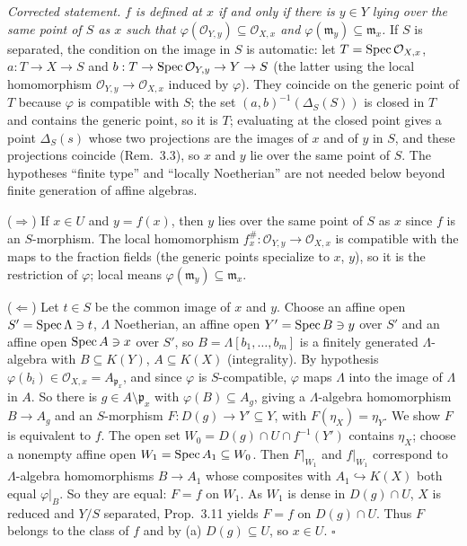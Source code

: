 \documentclass[11pt]{article}
\begin{document}
\emph{Corrected statement.} \emph{$f$ is defined at $x$ if and only if there is $y\in Y$ lying over the same point of $S$ as $x$ such that $\varphi(\mathcal O_{Y,y})\subseteq\mathcal O_{X,x}$ and $\varphi(\mathfrak m_y)\subseteq\mathfrak m_x$.} If $S$ is separated, the condition on the image in $S$ is automatic: let $T=\operatorname{Spec}\mathcal O_{X,x}$, $a:T\to X\to S$ and $b:T\to\operatorname{Spec}\mathcal O_{Y,y}\to Y\to S$ (the latter using the local homomorphism $\mathcal O_{Y,y}\to\mathcal O_{X,x}$ induced by $\varphi$). They coincide on the generic point of $T$ because $\varphi$ is compatible with $S$; the set $(a,b)^{-1}(\Delta_S(S))$ is closed in $T$ and contains the generic point, so it is $T$; evaluating at the closed point gives a point $\Delta_S(s)$ whose two projections are the images of $x$ and of $y$ in $S$, and these projections coincide (Rem.~3.3), so $x$ and $y$ lie over the same point of $S$. The hypotheses ``finite type'' and ``locally Noetherian'' are not needed below beyond finite generation of affine algebras.

($\Rightarrow$) If $x\in U$ and $y=f(x)$, then $y$ lies over the same point of $S$ as $x$ since $f$ is an $S$-morphism. The local homomorphism $f^\#_x:\mathcal O_{Y,y}\to\mathcal O_{X,x}$ is compatible with the maps to the fraction fields (the generic points specialize to $x$, $y$), so it is the restriction of $\varphi$; local means $\varphi(\mathfrak m_y)\subseteq\mathfrak m_x$.

($\Leftarrow$) Let $t\in S$ be the common image of $x$ and $y$. Choose an affine open $S'=\operatorname{Spec}\Lambda\ni t$, $\Lambda$ Noetherian, an affine open $Y'=\operatorname{Spec} B\ni y$ over $S'$ and an affine open $\operatorname{Spec} A\ni x$ over $S'$, so $B=\Lambda[b_1,\dots,b_m]$ is a finitely generated $\Lambda$-algebra with $B\subseteq K(Y)$, $A\subseteq K(X)$ (integrality). By hypothesis $\varphi(b_i)\in\mathcal O_{X,x}=A_{\mathfrak p_x}$, and since $\varphi$ is $S$-compatible, $\varphi$ maps $\Lambda$ into the image of $\Lambda$ in $A$. So there is $g\in A\setminus\mathfrak p_x$ with $\varphi(B)\subseteq A_g$, giving a $\Lambda$-algebra homomorphism $B\to A_g$ and an $S$-morphism $F:D(g)\to Y'\subseteq Y$, with $F(\eta_X)=\eta_Y$. We show $F$ is equivalent to $f$. The open set $W_0=D(g)\cap U\cap f^{-1}(Y')$ contains $\eta_X$; choose a nonempty affine open $W_1=\operatorname{Spec} A_1\subseteq W_0$. Then $F|_{W_1}$ and $f|_{W_1}$ correspond to $\Lambda$-algebra homomorphisms $B\to A_1$ whose composites with $A_1\hookrightarrow K(X)$ both equal $\varphi|_B$. So they are equal: $F=f$ on $W_1$. As $W_1$ is dense in $D(g)\cap U$, $X$ is reduced and $Y/S$ separated, Prop.~3.11 yields $F=f$ on $D(g)\cap U$. Thus $F$ belongs to the class of $f$ and by (a) $D(g)\subseteq U$, so $x\in U$. \hfill$\square$
\end{document}
